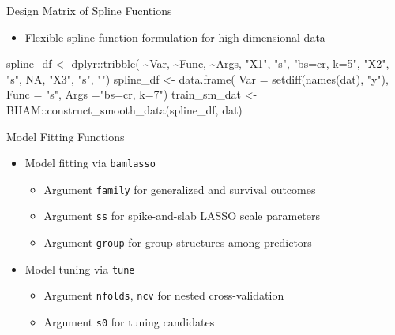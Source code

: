 \documentclass[
  ignorenonframetext,
  aspectratio=169]{beamer}
\newenvironment{Shaded}{\begin{snugshade}}{\end{snugshade}}
\newcommand{\AttributeTok}[1]{\textcolor[rgb]{0.77,0.63,0.00}{#1}}
\newcommand{\ConstantTok}[1]{\textcolor[rgb]{0.00,0.00,0.00}{#1}}
\newcommand{\FunctionTok}[1]{\textcolor[rgb]{0.00,0.00,0.00}{#1}}
\newcommand{\NormalTok}[1]{#1}
\newcommand{\OtherTok}[1]{\textcolor[rgb]{0.56,0.35,0.01}{#1}}
\newcommand{\SpecialCharTok}[1]{\textcolor[rgb]{0.00,0.00,0.00}{#1}}
\newcommand{\StringTok}[1]{\textcolor[rgb]{0.31,0.60,0.02}{#1}}
\providecommand{\tightlist}{%
  \setlength{\itemsep}{0pt}\setlength{\parskip}{0pt}}
\begin{document}
\begin{frame}[fragile]{Design Matrix of Spline Fucntions}
\protect\hypertarget{design-matrix-of-spline-fucntions}{}
\begin{itemize}
\tightlist
\item
  Flexible spline function formulation for high-dimensional data
\end{itemize}

\begin{Shaded}
\begin{Highlighting}[]
\NormalTok{spline\_df }\OtherTok{\textless{}{-}}\NormalTok{ dplyr}\SpecialCharTok{::}\FunctionTok{tribble}\NormalTok{(}
    \SpecialCharTok{\textasciitilde{}}\NormalTok{Var, }\SpecialCharTok{\textasciitilde{}}\NormalTok{Func, }\SpecialCharTok{\textasciitilde{}}\NormalTok{Args,}
    \StringTok{"X1"}\NormalTok{,  }\StringTok{"s"}\NormalTok{, }\StringTok{"bs=\textquotesingle{}cr\textquotesingle{}, k=5"}\NormalTok{,}
    \StringTok{"X2"}\NormalTok{,  }\StringTok{"s"}\NormalTok{, }\ConstantTok{NA}\NormalTok{,}
    \StringTok{"X3"}\NormalTok{,  }\StringTok{"s"}\NormalTok{, }\StringTok{""}\NormalTok{)}
\NormalTok{spline\_df }\OtherTok{\textless{}{-}} \FunctionTok{data.frame}\NormalTok{(}
    \AttributeTok{Var =} \FunctionTok{setdiff}\NormalTok{(}\FunctionTok{names}\NormalTok{(dat), }\StringTok{"y"}\NormalTok{),}
    \AttributeTok{Func =} \StringTok{"s"}\NormalTok{,}
    \AttributeTok{Args =}\StringTok{"bs=\textquotesingle{}cr\textquotesingle{}, k=7"}\NormalTok{)}
\NormalTok{train\_sm\_dat }\OtherTok{\textless{}{-}}\NormalTok{ BHAM}\SpecialCharTok{::}\FunctionTok{construct\_smooth\_data}\NormalTok{(spline\_df, dat)}
\end{Highlighting}
\end{Shaded}
\end{frame}

\begin{frame}[fragile]{Model Fitting Functions}
\protect\hypertarget{model-fitting-functions}{}
\begin{itemize}
\tightlist
\item
  Model fitting via \texttt{bamlasso}

  \begin{itemize}
  \tightlist
  \item
    Argument \texttt{family} for generalized and survival outcomes
  \item
    Argument \texttt{ss} for spike-and-slab LASSO scale parameters
  \item
    Argument \texttt{group} for group structures among predictors
  \end{itemize}
\item
  Model tuning via \texttt{tune}

  \begin{itemize}
  \tightlist
  \item
    Argument \texttt{nfolds}, \texttt{ncv} for nested cross-validation
  \item
    Argument \texttt{s0} for tuning candidates
  \end{itemize}
\end{itemize}
\end{frame}
\end{document}
